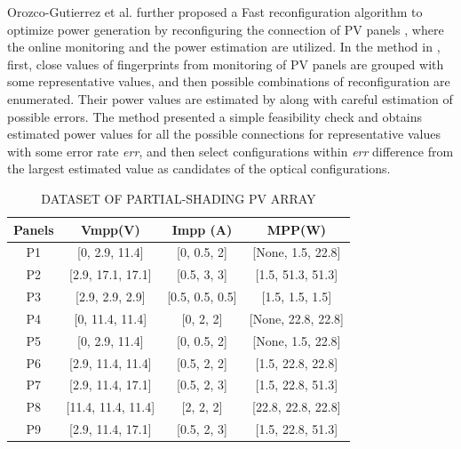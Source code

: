 \documentclass[conference]{IEEEtran}
\begin{document}
Orozco-Gutierrez et al. further proposed a Fast reconfiguration algorithm to optimize power generation by reconfiguring the connection of PV panels \cite{b10}, where the online monitoring \cite{b6} and the power estimation \cite{b7} are utilized. In the method in \cite{b10}, first, close values of fingerprints from monitoring of PV panels are grouped with some representative values, and then possible combinations of reconfiguration are enumerated. Their power values are estimated by \cite{b7} along with careful estimation of possible errors. The method presented a simple feasibility check and obtains estimated power values for all the possible connections for representative values with some error rate \textit{err}, and then select configurations within \textit{err} difference from the largest estimated value as candidates of the optical configurations. 
\begin{table}[htbp]
\caption{DATASET OF PARTIAL-SHADING PV ARRAY}
\begin{center}
\begin{tabular}{cccc}
Panels & Vmpp(V)                & Impp (A)            & MPP(W)                 \\ \hline
P1     & {[}0, 2.9, 11.4{]}     & {[}0, 0.5, 2{]}     & {[}None, 1.5, 22.8{]}     \\
P2     & {[}2.9, 17.1, 17.1{]}  & {[}0.5, 3, 3{]}     & {[}1.5, 51.3, 51.3{]}  \\
P3     & {[}2.9, 2.9, 2.9{]}    & {[}0.5, 0.5, 0.5{]} & {[}1.5, 1.5, 1.5{]}    \\
P4     & {[}0, 11.4, 11.4{]}    & {[}0, 2, 2{]}       & {[}None, 22.8, 22.8{]}    \\
P5     & {[}0, 2.9, 11.4{]}     & {[}0, 0.5, 2{]}     & {[}None, 1.5, 22.8{]}     \\
P6     & {[}2.9, 11.4, 11.4{]}  & {[}0.5, 2, 2{]}     & {[}1.5, 22.8, 22.8{]}  \\
P7     & {[}2.9, 11.4, 17.1{]}  & {[}0.5, 2, 3{]}     & {[}1.5, 22.8, 51.3{]}  \\
P8     & {[}11.4, 11.4, 11.4{]} & {[}2, 2, 2{]}       & {[}22.8, 22.8, 22.8{]} \\
P9     & {[}2.9, 11.4, 17.1{]}  & {[}0.5, 2, 3{]}     & {[}1.5, 22.8, 51.3{]} 
\end{tabular}
\label{tab1}
\end{center}
\end{table}
\end{document}
